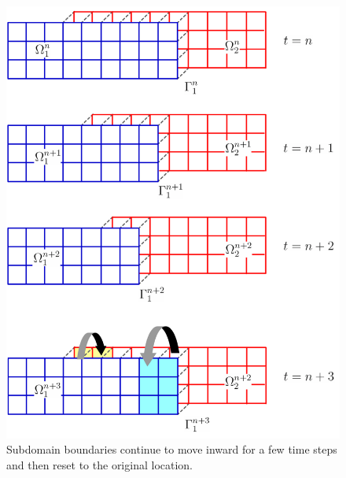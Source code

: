 \begin{figure}[p]
  \begin{center}
\includegraphics[scale=0.52]{../figures/RecedingBoundaryMethod-Grid.pdf}
    \caption{Subdomain boundaries continue to move inward for a few time steps and then reset to the original location.}
    \label{fig:RecedingBoundaryMethod-Grid}
  \end{center}
\end{figure}

